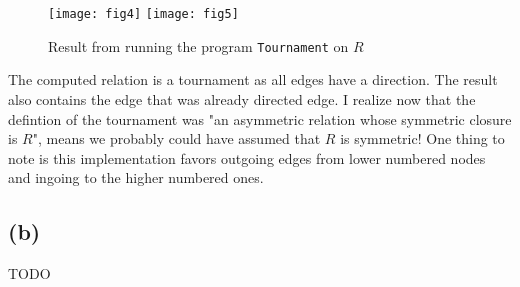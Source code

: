 \documentclass[a4paper, fleqn]{article}
\begin{document}
\begin{figure}[H]
  \centering
  \texttt{[image: fig4]}
  \texttt{[image: fig5]}
  \caption{Result from running the program \texttt{Tournament} on $R$}
\end{figure}
The computed relation is a tournament as all edges have a direction. The result also
contains the edge that was already directed edge. I realize
now that the defintion of the tournament was "an asymmetric relation whose symmetric
closure is $R$", means we probably could have assumed that $R$ is symmetric! One thing to
note is this implementation favors outgoing edges from lower numbered nodes and ingoing
to the higher numbered ones.

\subsection{(b)}
TODO
\end{document}
